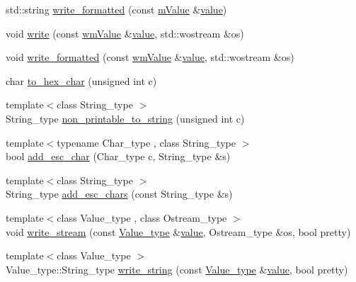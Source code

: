 \begin{DoxyCompactItemize}
\item 
std\+::string \hyperlink{namespacejson__spirit_a8770d920edbc69d90943bc758655213f}{write\+\_\+formatted} (const \hyperlink{namespacejson__spirit_a4dfd55710919c7c5e20fcbe4e4fe7b46}{m\+Value} \&\hyperlink{cache_8cc_a0f61d63b009d0880a89c843bd50d8d76}{value})
\item 
void \hyperlink{namespacejson__spirit_a2f9bf61dc880999a1ebe35791e23b13c}{write} (const \hyperlink{namespacejson__spirit_a2b6befe411be23e2a1a9ca590ef212b5}{wm\+Value} \&\hyperlink{cache_8cc_a0f61d63b009d0880a89c843bd50d8d76}{value}, std\+::wostream \&os)
\item 
void \hyperlink{namespacejson__spirit_ab0f72757c74b7b0874662433aa9559f5}{write\+\_\+formatted} (const \hyperlink{namespacejson__spirit_a2b6befe411be23e2a1a9ca590ef212b5}{wm\+Value} \&\hyperlink{cache_8cc_a0f61d63b009d0880a89c843bd50d8d76}{value}, std\+::wostream \&os)
\item 
char \hyperlink{namespacejson__spirit_a7ee656ae3409689f3ec6c60e74e5158f}{to\+\_\+hex\+\_\+char} (unsigned int c)
\item 
{\footnotesize template$<$class String\+\_\+type $>$ }\\String\+\_\+type \hyperlink{namespacejson__spirit_abe6464cf2c12f2e474590fb35ea27be1}{non\+\_\+printable\+\_\+to\+\_\+string} (unsigned int c)
\item 
{\footnotesize template$<$typename Char\+\_\+type , class String\+\_\+type $>$ }\\bool \hyperlink{namespacejson__spirit_a159eb9aa99d2bc308935c798cd692981}{add\+\_\+esc\+\_\+char} (Char\+\_\+type c, String\+\_\+type \&s)
\item 
{\footnotesize template$<$class String\+\_\+type $>$ }\\String\+\_\+type \hyperlink{namespacejson__spirit_a26a0654687c7613fd19d2a7e941b1e16}{add\+\_\+esc\+\_\+chars} (const String\+\_\+type \&s)
\item 
{\footnotesize template$<$class Value\+\_\+type , class Ostream\+\_\+type $>$ }\\void \hyperlink{namespacejson__spirit_a6eea0630f81345600834e8be70d87095}{write\+\_\+stream} (const \hyperlink{namespacejson__spirit_aeaad57c912e0370a76f60cd510ad3d74}{Value\+\_\+type} \&\hyperlink{cache_8cc_a0f61d63b009d0880a89c843bd50d8d76}{value}, Ostream\+\_\+type \&os, bool pretty)
\item 
{\footnotesize template$<$class Value\+\_\+type $>$ }\\Value\+\_\+type\+::\+String\+\_\+type \hyperlink{namespacejson__spirit_ad4b51f460af6cdec5b128f53f233b0c6}{write\+\_\+string} (const \hyperlink{namespacejson__spirit_aeaad57c912e0370a76f60cd510ad3d74}{Value\+\_\+type} \&\hyperlink{cache_8cc_a0f61d63b009d0880a89c843bd50d8d76}{value}, bool pretty)
\end{DoxyCompactItemize}
